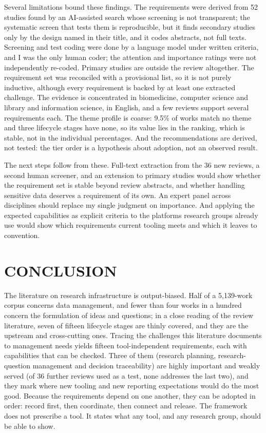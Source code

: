 \documentclass{IEEEcsmag}
\begin{document}
Several limitations bound these findings. The requirements were derived from 52 studies found by an AI-assisted search whose screening is not transparent; the systematic screen that tests them is reproducible, but it finds secondary studies only by the design named in their title, and it codes abstracts, not full texts. Screening and test coding were done by a language model under written criteria, and I was the only human coder; the attention and importance ratings were not independently re-coded. Primary studies are outside the review altogether. The requirement set was reconciled with a provisional list, so it is not purely inductive, although every requirement is backed by at least one extracted challenge. The evidence is concentrated in biomedicine, computer science and library and information science, in English, and a few reviews support several requirements each. The theme profile is coarse: 9.5\% of works match no theme and three lifecycle stages have none, so its value lies in the ranking, which is stable, not in the individual percentages. And the recommendations are derived, not tested: the tier order is a hypothesis about adoption, not an observed result.

The next steps follow from these. Full-text extraction from the 36 new reviews, a second human screener, and an extension to primary studies would show whether the requirement set is stable beyond review abstracts, and whether handling sensitive data deserves a requirement of its own. An expert panel across disciplines should replace my single judgment on importance. And applying the expected capabilities as explicit criteria to the platforms research groups already use would show which requirements current tooling meets and which it leaves to convention.

\section{CONCLUSION}

The literature on research infrastructure is output-biased. Half of a 5{,}139-work corpus concerns data management, and fewer than four works in a hundred concern the formulation of ideas and questions; in a close reading of the review literature, seven of fifteen lifecycle stages are thinly covered, and they are the upstream and cross-cutting ones. Tracing the challenges this literature documents to management needs yields fifteen tool-independent requirements, each with capabilities that can be checked. Three of them (research planning, research-question management and decision traceability) are highly important and weakly served (of 36 further reviews used as a test, none addresses the last two), and they mark where new tooling and new reporting expectations would do the most good. Because the requirements depend on one another, they can be adopted in order: record first, then coordinate, then connect and release. The framework does not prescribe a tool. It states what any tool, and any research group, should be able to show.
\end{document}
